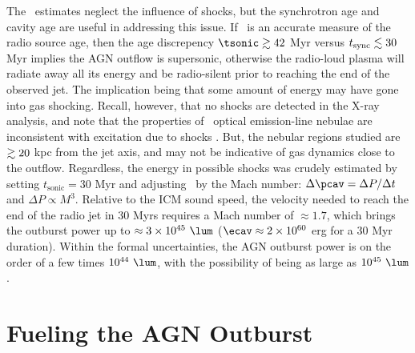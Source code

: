 \documentclass[useAMS,usenatbib]{mn2e}
\begin{document}
The \pcav\ estimates neglect the influence of shocks, but the
synchrotron age and cavity age are useful in addressing this issue. If
\tsync\ is an accurate measure of the radio source age, then the age
discrepency $\tsonic \ga 42$ Myr versus $t_{\mathrm{sync}} \lesssim 30$ Myr implies
the AGN outflow is supersonic, otherwise the radio-loud plasma will
radiate away all its energy and be radio-silent prior to reaching the
end of the observed jet. The implication being that some amount of
energy may have gone into gas shocking. Recall, however, that no
shocks are detected in the X-ray analysis, and note that the
properties of \irs\ optical emission-line nebulae are inconsistent
with excitation due to shocks \citep{1996MNRAS.283.1003C,
  2000AJ....120..562T}. But, the nebular regions studied are $\gtrsim 20$
kpc from the jet axis, and may not be indicative of gas dynamics close
to the outflow. Regardless, the energy in possible shocks was crudely
estimated by setting $t_{\mathrm{sonic}} = 30$ Myr and adjusting
\pcav\ by the Mach number: $\Delta \pcav = \Delta P / \Delta t$ and
$\Delta P \propto M^3$. Relative to the ICM sound speed, the velocity
needed to reach the end of the radio jet in 30 Myrs requires a Mach
number of $\approx 1.7$, which brings the outburst power up to
$\approx 3 \times 10^{45} ~\lum$ ($\ecav \approx 2 \times 10^{60}$ erg
for a 30 Myr duration). Within the formal uncertainties, the AGN
outburst power is on the order of a few times $10^{44} ~\lum$, with
the possibility of being as large as $10^{45} ~\lum$.

\section{Fueling the AGN Outburst}
\label{sec:fuel}
\end{document}
